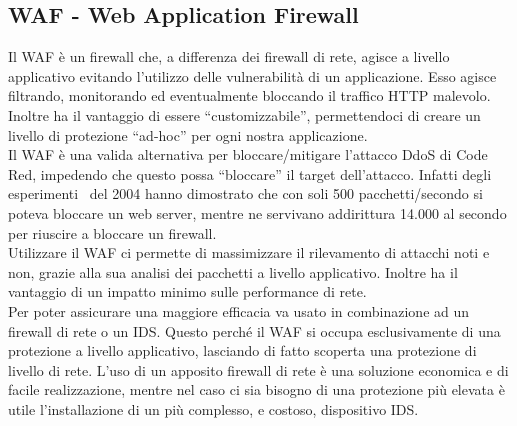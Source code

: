 \subsection{WAF - Web Application Firewall}
Il WAF è un firewall che, a differenza dei firewall di rete, agisce a livello applicativo evitando l’utilizzo delle vulnerabilità di un applicazione. Esso agisce filtrando, monitorando ed eventualmente bloccando il traffico HTTP malevolo.\\
Inoltre ha il vantaggio di essere “customizzabile”, permettendoci di creare un livello di protezione “ad-hoc” per ogni nostra applicazione.\\
Il WAF è una valida alternativa per bloccare/mitigare l’attacco DdoS di Code Red, impedendo che questo possa “bloccare” il target dell’attacco. Infatti degli esperimenti~\cite{sans-acl} del 2004 hanno dimostrato che con soli 500 pacchetti/secondo si poteva bloccare un web server, mentre ne servivano addirittura 14.000 al secondo per riuscire a bloccare un firewall.\\
Utilizzare il WAF ci permette di massimizzare il rilevamento di attacchi noti e non, grazie alla sua analisi dei pacchetti a livello applicativo. Inoltre ha il vantaggio di un impatto minimo sulle performance di rete.\\
Per poter assicurare una maggiore efficacia va usato in combinazione ad un firewall di rete o un IDS. Questo perché il WAF si occupa esclusivamente di una protezione a livello applicativo, lasciando di fatto scoperta una protezione di livello di rete. L’uso di un apposito firewall di rete è una soluzione economica e di facile realizzazione, mentre nel caso ci sia bisogno di una protezione più elevata è utile l’installazione di un più complesso, e costoso, dispositivo IDS.\\
